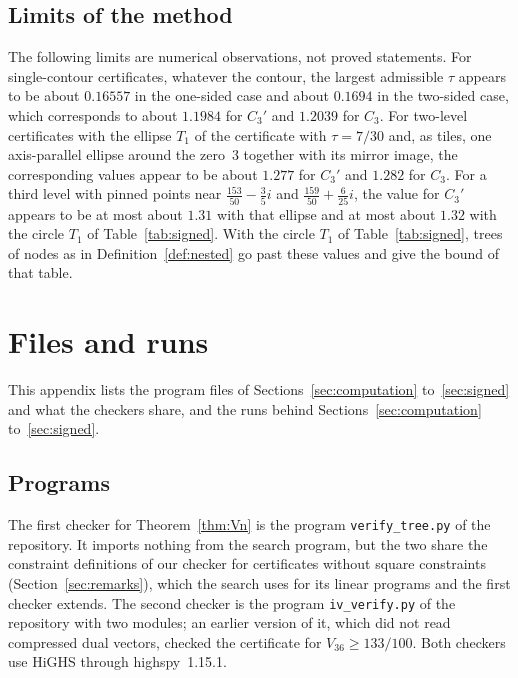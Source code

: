 \documentclass[11pt]{amsart}
\theoremstyle{definition}
\theoremstyle{remark}
\numberwithin{equation}{section}
\newcommand{\PinPoint}{\tfrac{153}{50}-\tfrac35i}
\newcommand{\PinPointTwo}{\tfrac{159}{50}+\tfrac{6}{25}i}
\newcommand{\CapTwoP}{1.277}
\newcommand{\CapTwo}{1.282}
\newcommand{\CapThree}{1.31}
\newcommand{\CapThreeCirc}{1.32}
\begin{document}
\subsection*{Limits of the method}
The following limits are numerical observations, not proved statements. For single-contour certificates, whatever the contour, the largest admissible $\tau$ appears to be about $0.16557$ in the one-sided case and about $0.1694$ in the two-sided case, which corresponds to about $1.1984$ for $C_3'$ and $1.2039$ for $C_3$. For two-level certificates with the ellipse $T_1$ of the certificate with $\tau=7/30$ and, as tiles, one axis-parallel ellipse around the zero~$3$ together with its mirror image, the corresponding values appear to be about $\CapTwoP$ for $C_3'$ and $\CapTwo$ for $C_3$. For a third level with pinned points near $\PinPoint$ and $\PinPointTwo$, the value for $C_3'$ appears to be at most about $\CapThree$ with that ellipse and at most about $\CapThreeCirc$ with the circle $T_1$ of Table~\ref{tab:signed}. With the circle $T_1$ of Table~\ref{tab:signed}, trees of nodes as in Definition~\ref{def:nested} go past these values and give the bound of that table.

\appendix
\section{Files and runs}\label{app:files}

This appendix lists the program files of Sections~\ref{sec:computation} to~\ref{sec:signed} and what the checkers share, and the runs behind Sections~\ref{sec:computation} to~\ref{sec:signed}.

\subsection*{Programs} The first checker for Theorem~\ref{thm:Vn} is the program \texttt{verify\_tree.py} of the repository. It imports nothing from the search program, but the two share the constraint definitions of our checker for certificates without square constraints (Section~\ref{sec:remarks}), which the search uses for its linear programs and the first checker extends. The second checker is the program \texttt{iv\_verify.py} of the repository with two modules; an earlier version of it, which did not read compressed dual vectors, checked the certificate for $V_{36}\ge133/100$. Both checkers use HiGHS through highspy~1.15.1.
\end{document}
